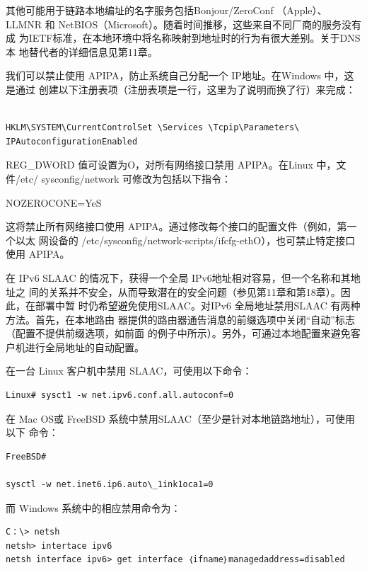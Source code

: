 \begin{tcolorbox}
  其他可能用于链路本地编址的名字服务包括Bonjour/ZeroConf （Apple）、
  LLMNR 和 NetBIOS（Microsoft）。随着时间推移，这些来自不同厂商的服务没有成
  为IETF标准，在本地环境中将名称映射到地址时的行为有很大差别。关于DNS本
  地替代者的详细信息见第11章。
\end{tcolorbox}

我们可以禁止使用 APIPA，防止系统自己分配一个 IP地址。在Windows 中，这是通过
创建以下注册表项（注册表项是一行，这里为了说明而换了行）来完成：

\begin{verbatim}

HKLM\SYSTEM\CurrentControlSet \Services \Tcpip\Parameters\
IPAutoconfigurationEnabled
\end{verbatim}

REG\_DWORD 值可设置为O，对所有网络接口禁用 APIPA。在Linux 中，文件/etc/
sysconfig/network 可修改为包括以下指令：

NOZEROCONE=YeS

这将禁止所有网络接口使用 APIPA。通过修改每个接口的配置文件（例如，第一个以太
网设备的 /etc/sysconfig/network-scripts/ifcfg-ethO），也可禁止特定接口使用 APIPA。

在 IPv6 SLAAC 的情况下，获得一个全局 IPv6地址相对容易，但一个名称和其地址之
间的关系并不安全，从而导致潜在的安全问题（参见第11章和第18章）。因此，在部署中暂
时仍希望避免使用SLAAC。对IPv6 全局地址禁用SLAAC 有两种方法。首先，在本地路由
器提供的路由器通告消息的前缀选项中关闭“自动”标志（配置不提供前缀选项，如前面
的例子中所示）。另外，可通过本地配置来避免客户机进行全局地址的自动配置。

在一台 Linux 客户机中禁用 SLAAC，可使用以下命令：

\begin{verbatim}
Linux# sysct1 -w net.ipv6.conf.all.autoconf=0
\end{verbatim}

在 Mac OS或 FreeBSD 系统中禁用SLAAC（至少是针对本地链路地址），可使用以下
命令：

\begin{verbatim}
FreeBSD#

sysctl -w net.inet6.ip6.auto\_1ink1oca1=0
\end{verbatim}
而 Windows 系统中的相应禁用命令为：

\begin{verbatim}
C：\> netsh
netsh> intertace ipv6
netsh interface ipv6> get interface ｛ifname｝managedaddress=disabled
\end{verbatim}


